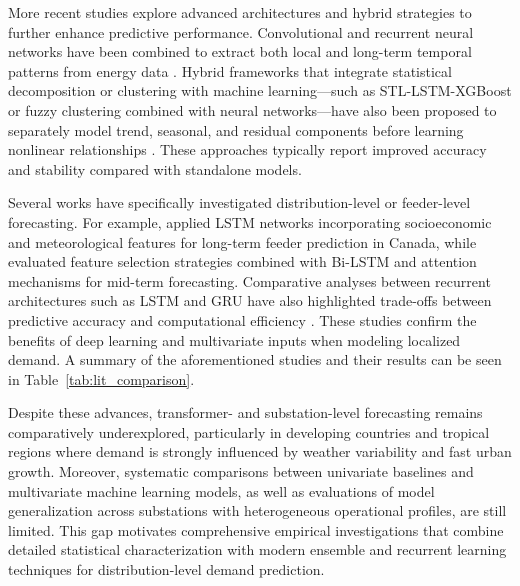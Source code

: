 More recent studies explore advanced architectures and hybrid strategies to further enhance predictive performance. Convolutional and recurrent neural networks have been combined to extract both local and long-term temporal patterns from energy data \cite{Maleki2024}. Hybrid frameworks that integrate statistical decomposition or clustering with machine learning—such as STL-LSTM-XGBoost or fuzzy clustering combined with neural networks—have also been proposed to separately model trend, seasonal, and residual components before learning nonlinear relationships \cite{Zhang2023, Hussein2024, Alsalem2025}. These approaches typically report improved accuracy and stability compared with standalone models.

Several works have specifically investigated distribution-level or feeder-level forecasting. For example, \cite{Dong2019} applied LSTM networks incorporating socioeconomic and meteorological features for long-term feeder prediction in Canada, while \cite{Yaprakdal2023} evaluated feature selection strategies combined with Bi-LSTM and attention mechanisms for mid-term forecasting. Comparative analyses between recurrent architectures such as LSTM and GRU have also highlighted trade-offs between predictive accuracy and computational efficiency \cite{Becker2024}. These studies confirm the benefits of deep learning and multivariate inputs when modeling localized demand. A summary of the aforementioned studies and their results can be seen in Table~\ref{tab:lit_comparison}.

Despite these advances, transformer- and substation-level forecasting remains comparatively underexplored, particularly in developing countries and tropical regions where demand is strongly influenced by weather variability and fast urban growth. Moreover, systematic comparisons between univariate baselines and multivariate machine learning models, as well as evaluations of model generalization across substations with heterogeneous operational profiles, are still limited. This gap motivates comprehensive empirical investigations that combine detailed statistical characterization with modern ensemble and recurrent learning techniques for distribution-level demand prediction.

